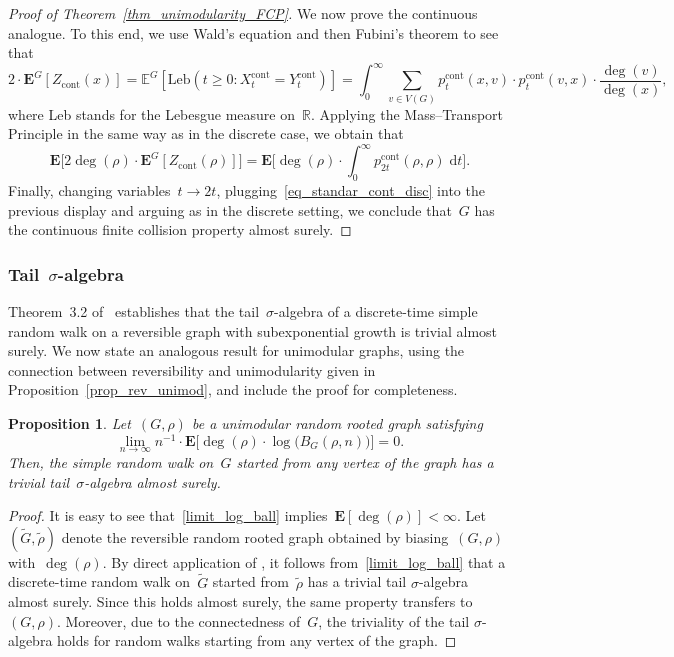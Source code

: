 \documentclass[a4paper,11pt]{article}
\newcommand{\EE}{\mathbb{E}}
\newcommand{\RR}{\mathbb{R}}
\newtheorem{proposition}{Proposition}
\theoremstyle{definition}
\begin{document}
\begin{proof}[Proof of Theorem~\ref{thm_unimodularity_FCP}]
We now prove the continuous analogue. To this end, we use Wald's equation and then Fubini's theorem to see that
$$ 2 \cdot \mathbf E^G [ Z_\mathrm{cont}(x)] = \EE^G[ \mathrm{Leb}(t \ge 0: X^\mathrm{cont}_t = Y^\mathrm{cont}_t) ] = \int^\infty_0 \sum_{v \in V(G)} p^\mathrm{cont}_t(x,v) \cdot p^\mathrm{cont}_t(v,x) \cdot \frac{\deg(v)}{\deg(x)}, $$
where Leb stands for the Lebesgue measure on~$\RR$. Applying the Mass–Transport Principle in the same way as in the discrete case, we obtain that
\begin{equation*}
    \mathbf E \big[ 2 \deg(\rho) \cdot \mathbf E^G[Z_\mathrm{cont}(\rho)] \big] = \mathbf E \big[ \deg(\rho) \cdot \int^\infty_0 p^\mathrm{cont}_{2t}(\rho,\rho) \; \mathrm{d}t \big].
\end{equation*}
Finally, changing variables~$t \to 2t$, plugging~\eqref{eq_standar_cont_disc} into the previous display and arguing as in the discrete setting, we conclude that~$G$ has the continuous finite collision property almost surely.
\end{proof}

\subsubsection{Tail~$\sigma$-algebra}
Theorem~3.2 of~\cite{BenjaminiCurien2012} establishes that the tail~$\sigma$-algebra of a discrete-time simple random walk on a reversible graph with subexponential growth is trivial almost surely. We now state an analogous result for unimodular graphs, using the connection between reversibility and unimodularity given in Proposition~\ref{prop_rev_unimod}, and include the proof for completeness.
\begin{proposition}\label{thm_Liouville}\cite{BenjaminiCurien2012}
    Let~$(G,\rho)$ be a unimodular random rooted graph satisfying
    \begin{equation}\label{limit_log_ball}
        \lim_{n \to \infty} n^{-1} \cdot \mathbf E \big[ \deg(\rho) \cdot \log \big( B_G(\rho,n) \big) \big] = 0.
    \end{equation}
    Then, the simple random walk on~$G$ started from any vertex of the graph has a trivial tail~$\sigma$-algebra almost surely.
\end{proposition}
\begin{proof}
It is easy to see that~\eqref{limit_log_ball} implies~$\mathbf E[\deg(\rho)]<\infty$. Let~$(\tilde G,\tilde \rho)$ denote the reversible random rooted graph obtained by biasing~$(G,\rho)$ with~$\deg(\rho)$. By direct application of \cite[Theorem~3.2]{BenjaminiCurien2012}, it follows from~\eqref{limit_log_ball} that a discrete-time random walk on~$\tilde G$ started from~$\tilde \rho$ has a trivial tail $\sigma$-algebra almost surely. Since this holds almost surely, the same property transfers to~$(G,\rho)$. Moreover, due to the connectedness of~$G$, the triviality of the tail $\sigma$-algebra holds for random walks starting from any vertex of the graph. 
\end{proof}
\end{document}
